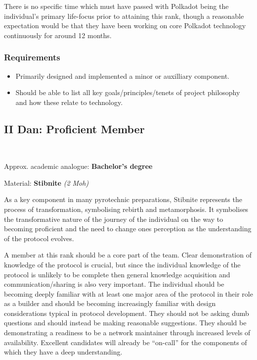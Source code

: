 \documentclass[9pt,oneside]{amsart}
\begin{document}
There is no specific time which must have passed with Polkadot being the individual's primary life-focus prior to attaining this rank, though a reasonable expectation would be that they have been working on core Polkadot technology continuously for around 12 months.

\subsubsection{Requirements}\label{requirements}

\begin{itemize}
\item Primarily designed and implemented a minor or auxilliary component.
\item Should be able to list all key goals/principles/tenets of project philosophy and how these relate to technology.
\end{itemize}

\subsection{II Dan: Proficient Member}\label{ii-dan-proficient-member}~\\


Approx. academic analogue: \textbf{Bachelor's degree}

Material: \textbf{Stibnite} \emph{(2 Moh)}

As a key component in many pyrotechnic preparations, Stibnite represents the process of transformation, symbolising rebirth and metamorphosis. It symbolises the transformative nature of the journey of the individual on the way to becoming proficient and the need to change ones perception as the understanding of the protocol evolves.

A member at this rank should be a core part of the team. Clear demonstration of knowledge of the protocol is crucial, but since the individual knowledge of the protocol is unlikely to be complete then general knowledge acquisition and communication/sharing is also very important. The individual should be becoming deeply familiar with at least one major area of the protocol in their role as a builder and should be becoming increasingly familiar with design considerations typical in protocol development. They should not be asking dumb questions and should instead be making reasonable suggestions. They should be demonstrating a readiness to be a network maintainer through increased levels of availability. Excellent candidates will already be ``on-call'' for the components of which they have a deep understanding.
\end{document}

